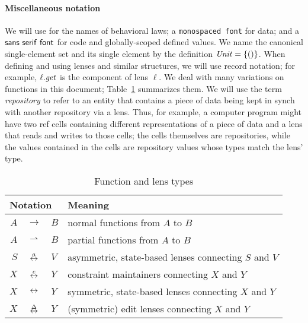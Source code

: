 \paragraph*{Miscellaneous notation}
We will use  for the names of behavioral laws; a
\texttt{monospaced font} for data; and a $\mathsf{sans\ serif\ font}$ for code
and globally-scoped defined values. We name the canonical single-element set
and its single element by the definition $\mathit{Unit}=\{{()}\}$. When defining
and using lenses and similar structures, we will use record notation; for
example, $\ell.\mathit{get}$ is the \GET component of lens $\ell$. We deal with
many variations on functions in this document; Table~\ref{tab:arrows}
summarizes them. We will use the term \emph{repository} to refer to an
entity that contains a piece of data being kept in synch with another
repository via a lens. Thus, for example, a computer program might have two
ref cells containing different representations of a piece of data and a lens
that reads and writes to those cells; the cells themselves are repositories,
while the values contained in the cells are repository values whose types
match the lens' type.
\begin{table}
    \centering
    \begin{tabular}{r@{}c@{}l|l}
        \multicolumn{3}{l|}{Notation} & Meaning \\
        \hline
        $A$ & ${}\to       {}$ & $B$ & normal functions from $A$ to $B$ \\
        $A$ & ${}\rightharpoonup{}$ & $B$ & partial functions from $A$ to $B$ \\
        $S$ & ${}\overset{a}{\leftrightarrow}    {}$ & $V$ & asymmetric, state-based lenses connecting $S$ and $V$ \\
        $X$ & ${}\overset{c}{\leftrightarrow}   {}$ & $Y$ & constraint maintainers connecting $X$ and $Y$ \\
        $X$ & ${}\leftrightarrow     {}$ & $Y$ & symmetric, state-based lenses connecting $X$ and $Y$ \\
        $X$ & ${}\overset{\Delta}{\leftrightarrow}    {}$ & $Y$ & (symmetric) edit lenses connecting $X$ and $Y$
    \end{tabular}
    \caption{Function and lens types}
    \label{tab:arrows}
\end{table}

